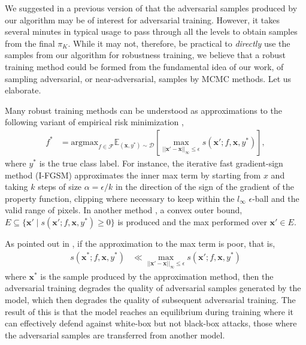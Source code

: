 
We suggested in a previous version of \citet{webb2018statistical} that the adversarial samples produced by our algorithm may be of interest for adversarial training. However, it takes several minutes in typical usage to pass through all the levels to obtain samples from the final $\pi_K$. While it may not, therefore, be practical to \emph{directly} use the samples from our algorithm for robustness training, we believe that a robust training method could be formed from the fundamental idea of our work, of sampling adversarial, or near-adversarial, samples by MCMC methods. Let us elaborate.

Many robust training methods can be understood as approximations to the following variant of empirical risk minimization \citep{madry2017towards, tramer2017ensemble},
\begin{align*}
	f^* &= \text{argmax}_{f\in\mathcal{F}}\mathbb{E}_{(\mathbf{x},y^*)\sim\mathcal{D}}\left[\max_{||\mathbf{x}'-\mathbf{x}||_\infty\le\epsilon}s(\mathbf{x}';f,\mathbf{x},y^*)\right],
\end{align*}
where $y^*$ is the true class label. For instance, the iterative fast gradient-sign method (I-FGSM) \citep{goodfellow2014explaining} approximates the inner max term by starting from $x$ and taking $k$ steps of size $\alpha=\epsilon/k$ in the direction of the sign of the gradient of the property function, clipping where necessary to keep within the $l_\infty$ $\epsilon$-ball and the valid range of pixels. In another method \citep{kolter2017provable, wong2018explaining}, a convex outer bound, $E\subseteq\{\mathbf{x}'\mid s(\mathbf{x}';f,\mathbf{x},y^*)\ge0\}$ is produced and the max performed over $\mathbf{x}'\in E$.

As pointed out in \citep{tramer2017ensemble}, if the approximation to the max term is poor, that is,
\begin{align*}
	s(\mathbf{x}^*;f,\mathbf{x},y^*) &\ll  \max_{||\mathbf{x}'-\mathbf{x}||_\infty\le\epsilon}s(\mathbf{x}';f,\mathbf{x},y^*)
\end{align*}
where $\mathbf{x}^*$ is the sample produced by the approximation method, then the adversarial training degrades the quality of adversarial samples generated by the model, which then degrades the quality of subsequent adversarial training. The result of this is that the model reaches an equilibrium during training where it can effectively defend against white-box but not black-box attacks, those where the adversarial samples are transferred from another model.

